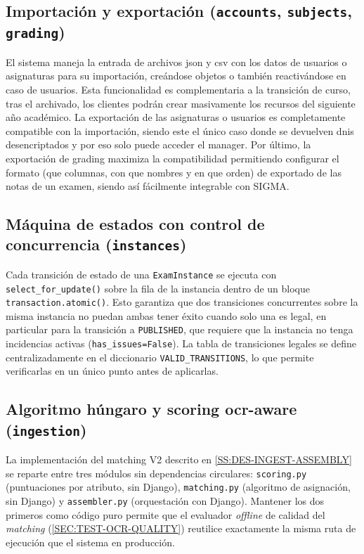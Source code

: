 \subsection{Importación y exportación (\texttt{accounts}, \texttt{subjects}, \texttt{grading})}

El sistema maneja la entrada de archivos json y csv con los datos de usuarios o asignaturas
para su importación, creándose objetos o también reactivándose en caso de usuarios. Esta
funcionalidad es complementaria a la transición de curso, tras el archivado, los clientes
podrán crear masivamente los recursos del siguiente año académico. La exportación de las
asignaturas o usuarios es completamente compatible con la importación,
siendo este el único caso donde se devuelven dnis desencriptados y por eso
solo puede acceder el manager. Por último, la exportación de grading maximiza la compatibilidad
permitiendo configurar el formato (que columnas, con que nombres y en que orden) de exportado
de las notas de un examen, siendo así fácilmente integrable con SIGMA.

\subsection{Máquina de estados con control de concurrencia (\texttt{instances})}

Cada transición de estado de una \texttt{ExamInstance} se ejecuta
con \texttt{select\_for\_update()} sobre la fila de la instancia
dentro de un bloque \texttt{transaction.atomic()}. Esto
garantiza que dos transiciones concurrentes sobre la misma instancia
no puedan ambas tener éxito cuando solo una es legal, en particular
para la transición a \texttt{PUBLISHED}, que requiere que la
instancia no tenga incidencias activas (\texttt{has\_issues=False}).
La tabla de transiciones legales se define centralizadamente en el
diccionario \texttt{VALID\_TRANSITIONS}, lo que permite verificarlas
en un único punto antes de aplicarlas.


\subsection{Algoritmo húngaro y scoring \acs{ocr}-aware (\texttt{ingestion})}
\label{SS:IMPL-MATCHING}

La implementación del matching V2 descrito en
\cref{SS:DES-INGEST-ASSEMBLY} se reparte entre tres módulos sin
dependencias circulares: \texttt{scoring.py} (puntuaciones por
atributo, sin Django), \texttt{matching.py} (algoritmo de asignación,
sin Django) y \texttt{assembler.py} (orquestación con Django).
Mantener los dos primeros como código puro permite que el evaluador
\textit{offline} de calidad del \textit{matching}
(\cref{SEC:TEST-OCR-QUALITY}) reutilice exactamente la misma ruta de
ejecución que el sistema en producción.

